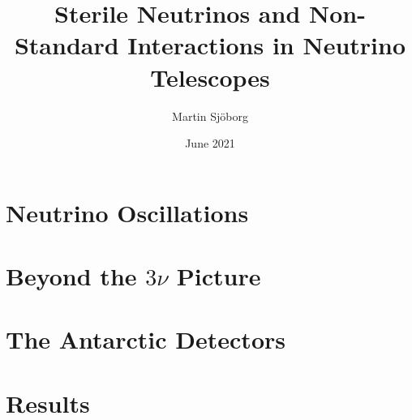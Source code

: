 
\renewcommand{\familydefault}{\rmdefault}

% 


\title{Sterile Neutrinos and Non-Standard Interactions in Neutrino Telescopes}
\author{Martin Sjöborg}
\date{June 2021}
\address{SE-106 91 Stockholm, Sweden}


\maketitle

\cleardoublepage

%

%

\tableofcontents

%


\mainmatter

\cleardoublepage
\chapter{Neutrino Oscillations}\label{ch:osc}


\chapter{Beyond the $3\nu$ Picture}\label{ch:theory}


\chapter{The Antarctic Detectors}\label{ch:ic}



\chapter{Results}\label{ch:results}




% 
% 

